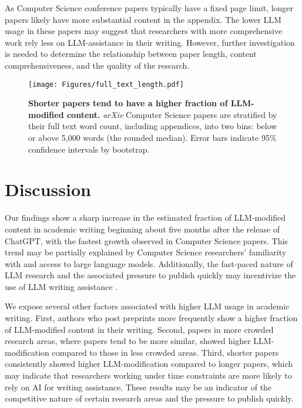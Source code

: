 \documentclass{article}
\begin{document}
As Computer Science conference papers typically have a fixed page limit, longer papers likely have more substantial content in the appendix. The lower LLM usage in these papers may suggest that researchers with more comprehensive work rely less on LLM-assistance in their writing. However, further investigation is needed to determine the relationship between paper length, content comprehensiveness, and the quality of the research.





\begin{figure}[htb]
\centering
\texttt{[image: Figures/full\_text\_length.pdf]}
\caption{
\textbf{Shorter papers tend to have a higher fraction of LLM-modified content.}
\textit{arXiv} Computer Science papers are stratified by their full text word count, including appendices, into two bins: below or above 5,000 words (the rounded median). 
Error bars indicate 95\% confidence intervals by bootstrap.
}
\label{fig: temporal-full-length}
\end{figure}
 

\section{Discussion}





Our findings show a sharp increase in the estimated fraction of LLM-modified content in academic writing beginning about five months after the release of ChatGPT, with the fastest growth observed in Computer Science papers. This trend may be partially explained by Computer Science researchers' familiarity with and access to large language models. Additionally, the fast-paced nature of LLM research and the associated pressure to publish quickly may incentivize the use of LLM writing assistance \citep{foster2015tradition}.


We expose several other factors associated with higher LLM usage in academic writing. First, authors who post preprints more frequently show a higher fraction of LLM-modified content in their writing. Second, papers in more crowded research areas, where papers tend to be more similar, showed higher LLM-modification compared to those in less crowded areas. Third, shorter papers consistently showed higher LLM-modification compared to longer papers, which may indicate that researchers working under time constraints are more likely to rely on AI for writing assistance. These results may be an indicator of the competitive nature of certain research areas and the pressure to publish quickly. 
\end{document}
